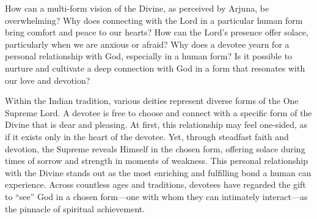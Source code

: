 \newpage
\begin{mananam}{}
\normalfont\mananamtext How can a multi-form vision of the Divine, as perceived by Arjuna, be overwhelming? Why does connecting with the Lord in a particular human form bring comfort and peace to our hearts? How can the Lord’s presence offer solace, particularly when we are anxious or afraid?
Why does a devotee yearn for a personal relationship with God, especially in a human form? Is it possible to nurture and cultivate a deep connection with God in a form that resonates with our love and devotion?
\end{mananam}
\sreflect
\begin{inspiration}{}
\normalfont\mananamtext Within the Indian tradition, various deities represent diverse forms of the One Supreme Lord. A devotee is free to choose and connect with a specific form of the Divine that is dear and pleasing. At first, this relationship may feel one-sided, as if it exists only in the heart of the devotee. Yet, through steadfast faith and devotion, the Supreme reveals Himself in the chosen form, offering solace during times of sorrow and strength in moments of weakness.
This personal relationship with the Divine stands out as the most enriching and fulfilling bond a human can experience. Across countless ages and traditions, devotees have regarded the gift to “see” God in a chosen form—one with whom they can intimately interact—as the pinnacle of spiritual achievement.
\end{inspiration}
\newpage


